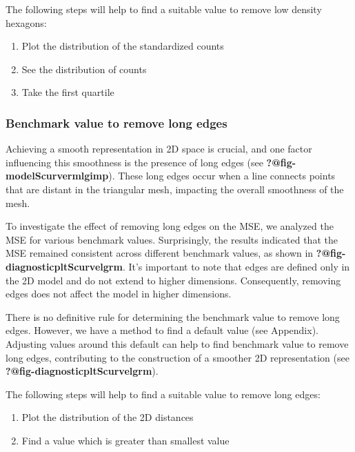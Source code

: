 \documentclass[
  12pt]{article}
\begin{document}
The following steps will help to find a suitable value to remove low
density hexagons:

\begin{enumerate}
\def\labelenumi{\arabic{enumi}.}
\item
  Plot the distribution of the standardized counts
\item
  See the distribution of counts
\item
  Take the first quartile
\end{enumerate}

\hypertarget{benchmark-value-to-remove-long-edges}{%
\subsubsection{Benchmark value to remove long
edges}\label{benchmark-value-to-remove-long-edges}}

Achieving a smooth representation in 2D space is crucial, and one factor
influencing this smoothness is the presence of long edges (see
\textbf{?@fig-modelScurvermlgimp}). These long edges occur when a line
connects points that are distant in the triangular mesh, impacting the
overall smoothness of the mesh.

To investigate the effect of removing long edges on the MSE, we analyzed
the MSE for various benchmark values. Surprisingly, the results
indicated that the MSE remained consistent across different benchmark
values, as shown in \textbf{?@fig-diagnosticpltScurvelgrm}. It's
important to note that edges are defined only in the 2D model and do not
extend to higher dimensions. Consequently, removing edges does not
affect the model in higher dimensions.

There is no definitive rule for determining the benchmark value to
remove long edges. However, we have a method to find a default value
(see Appendix). Adjusting values around this default can help to find
benchmark value to remove long edges, contributing to the construction
of a smoother 2D representation (see
\textbf{?@fig-diagnosticpltScurvelgrm}).

The following steps will help to find a suitable value to remove long
edges:

\begin{enumerate}
\def\labelenumi{\arabic{enumi}.}
\item
  Plot the distribution of the 2D distances
\item
  Find a value which is greater than smallest value
\end{enumerate}
\end{document}
